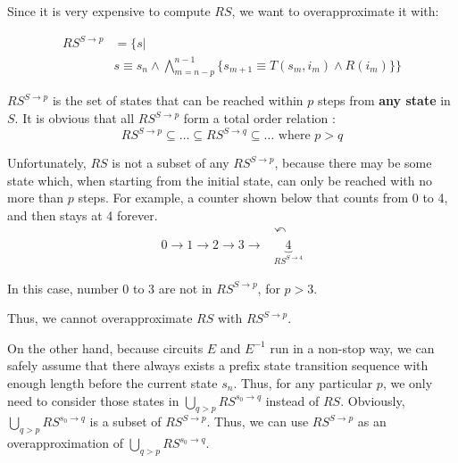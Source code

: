 \documentclass[journal]{IEEEtran}
\begin{document}
Since it is very expensive to compute $RS$,
we want to overapproximate it with:

\begin{equation}\label{apprse}
\begin{split}
RS^{S\to p} & =  \Big\{s| \\
& s\equiv s_n\wedge \bigwedge_{m=n-p}^{n-1}\big\{
s_{m+1}\equiv T(s_m,i_m)\wedge R(i_m)
\big\}\Big\}
\end{split}
\end{equation}

$RS^{S\to p}$ is the set of states that can be reached within $p$ steps from \textbf{any state} in $S$.
It is obvious that all $RS^{S\to p}$ form a total order relation :
\begin{displaymath}
RS^{S\to p}\subseteq\dots \subseteq RS^{S\to q}\subseteq\dots \textrm{  where } p>q
\end{displaymath}
%

Unfortunately,
$RS$ is not a subset of any $RS^{S\to p}$,
because there may be some state which,
when starting from the initial state,
can only be reached with no more than $p$ steps.
For example,
a counter shown below that counts from 0 to 4,
and then stays at 4 forever.
\begin{displaymath}
\begin{array}{cc}
&\curvearrowleft \\
0\to 1\to 2\to 3\to & \underbrace{4}_{RS^{S\to 4}}
\end{array}
\end{displaymath}


In this case,
number 0 to 3 are not in $RS^{S\to p}$,
for $p>3$.

Thus,
we cannot overapproximate $RS$ with $RS^{S\to p}$.

On the other hand,
because circuits $E$ and $E^{-1}$ run in a non-stop way,
we can safely assume that there always exists a prefix state transition sequence with enough length before the current state $s_n$.
Thus,
for any particular $p$,
we only need to consider those states in $\bigcup_{q>p}RS^{s_0\to q}$ instead of $RS$.
Obviously,
$\bigcup_{q>p}RS^{s_0\to q}$ is a subset of $RS^{S\to p}$.
Thus,
we can use $RS^{S\to p}$ as an overapproximation of $\bigcup_{q>p}RS^{s_0\to q}$.
\end{document}
